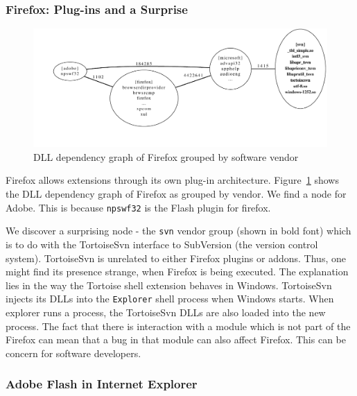 \subsubsection{Firefox: Plug-ins and a Surprise}

\begin{figure}
\centering
\includegraphics[width=1.0\columnwidth]{depvis/firefox-vendor.pdf}
\caption{DLL dependency graph of Firefox grouped by software vendor}
\label{fig:firefox}
\end{figure}

Firefox allows extensions through its own plug-in architecture.
Figure~\ref{fig:firefox} shows the DLL dependency graph
of Firefox as grouped by vendor. We find a node for Adobe.
This is because {\tt npswf32} is the Flash plugin for firefox.

We discover a surprising node -
the {\tt svn} vendor group (shown in bold font) which is to do with
the TortoiseSvn interface to SubVersion (the version control system).
TortoiseSvn is unrelated to either Firefox plugins or addons.
Thus, one might find its presence strange, when Firefox is being executed.
The explanation lies in the way the Tortoise shell extension
behaves in Windows. TortoiseSvn injects its DLLs into the
{\tt Explorer} shell process when Windows starts.
When explorer runs a process, the TortoiseSvn
DLLs are also loaded into the new process.
The fact that there is interaction with a module which is not part of
the Firefox can mean that a bug in that module can also affect Firefox.
This can be concern for software developers.

\subsubsection{Adobe Flash in Internet Explorer}
\label{sec:flash}


